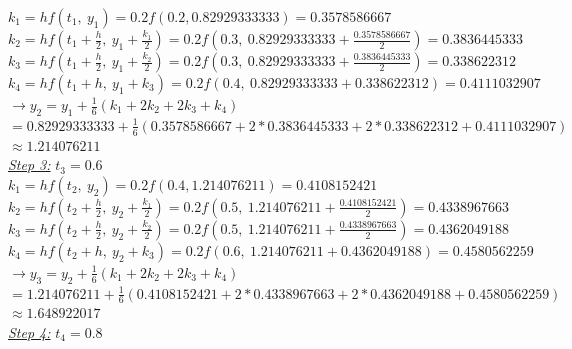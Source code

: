\documentclass[a4paper]{article}
\numberwithin{equation}{section}
\begin{document}
  $k_1 = hf(t_1,~ y_1) = 0.2f(0.2,0.82929333333) = 0.3578586667$\\
  
  $k_2 = hf \left(t_1 + \frac{h}{2},~ y_1 + \frac{k_1}{2}\right) = 0.2f(0.3,~ 0.82929333333 + \frac{0.3578586667}{2}) = 0.3836445333$\\
  
  $k_3 = hf \left(t_1 + \frac{h}{2},~ y_1 + \frac{k_2}{2}\right) = 0.2f(0.3,~ 0.82929333333 + \frac{0.3836445333}{2}) = 0.338622312$\\
  
  $k_4 = hf(t_1 + h,~ y_1 + k_3) = 0.2f(0.4,~ 0.82929333333 + 0.338622312) = 0.4111032907$\\
  
  $\rightarrow y_2 = y_1 + \frac{1}{6}(k_1 + 2k_2 + 2k_3 + k_4)$\\
  
  $= 0.82929333333 + \frac{1}{6} \left(0.3578586667 + 2*0.3836445333 + 2*0.338622312 + 0.4111032907\right)$\\   
  
  $\approx 1.214076211$\\

\underline{\textit{Step 3:}} \(t_3=0.6\)\\

    $k_1 = hf(t_2,~ y_2) = 0.2f(0.4,1.214076211) = 0.4108152421$\\
  
    $k_2 = hf\left(t_2 + \frac{h}{2},~ y_2 + \frac{k_1}{2}\right) = 0.2f(0.5,~ 1.214076211 + \frac{0.4108152421}{2}) = 0.4338967663$\\
    
    $k_3 =hf\left(t_2 + \frac{h}{2},~ y_2 + \frac{k_2}{2}\right) = 0.2f(0.5,~ 1.214076211 + \frac{0.4338967663}{2}) = 0.4362049188$\\
    
    $k_4 = hf(t_2 + h,~ y_2 + k_3) = 0.2f(0.6,~ 1.214076211 + 0.4362049188) = 0.4580562259$\\
    
    $\rightarrow y_3 = y_2 + \frac{1}{6}(k_1 + 2k_2 + 2k_3 + k_4)$\\ 
    
    $= 1.214076211 + \frac{1}{6} \left(0.4108152421 + 2*0.4338967663 + 2*  0.4362049188 + 0.4580562259\right)$\\
    
    $\approx 1.648922017$\\

\underline{\textit{Step 4:}} \(t_4=0.8\)\\
\end{document}
